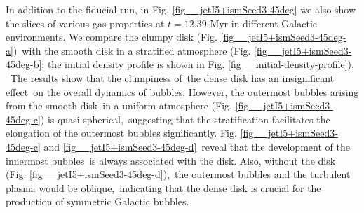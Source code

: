 \documentclass[fleqn,usenatbib,useAMS]{mnras}
\begin{document}
 In addition to the fiducial run, in Fig. \ref{fig__jetI5+ismSeed3-45deg} we also show the slices of various gas properties at $t=12.39$ Myr in different Galactic environments. We compare the clumpy disk (Fig. \ref{fig__jetI5+ismSeed3-45deg-a})\
 with the smooth disk in a stratified atmosphere (Fig. \ref{fig__jetI5+ismSeed3-45deg-b}; the initial density profile is shown in Fig. \ref{fig__initial-density-profile}). \
 The results show that the clumpiness of\
 the dense disk has an insignificant effect\
 on the overall dynamics of bubbles. However, the outermost bubbles arising from the smooth disk\
 in a uniform atmosphere (Fig. \ref{fig__jetI5+ismSeed3-45deg-c}) is quasi-spherical,\
 suggesting that the stratification facilitates the elongation of the outermost bubbles significantly. Fig. \ref{fig__jetI5+ismSeed3-45deg-c} and \ref{fig__jetI5+ismSeed3-45deg-d}\
 reveal that the development of the innermost bubbles\
 is always associated with the disk. Also, without the disk (Fig. \ref{fig__jetI5+ismSeed3-45deg-d}),\
 the outermost bubbles and the turbulent plasma would be oblique,\
 indicating that the dense disk is crucial for the production of symmetric Galactic bubbles.\
\end{document}
